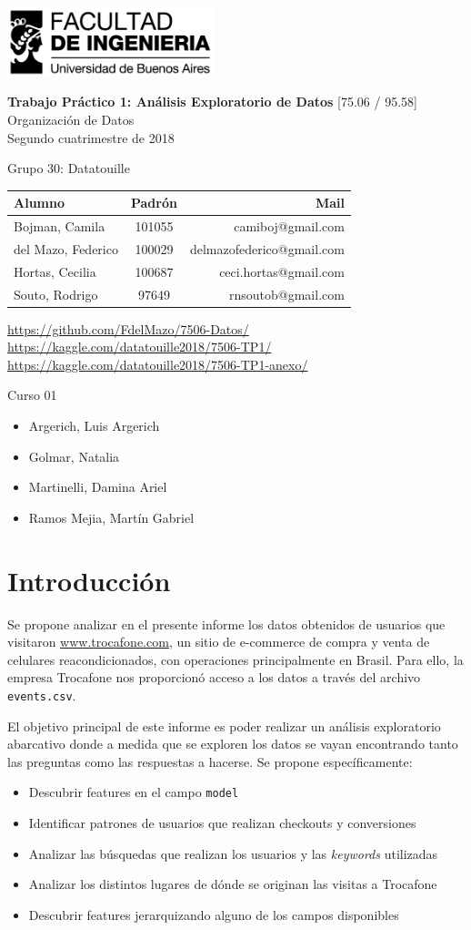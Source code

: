 \documentclass[a4paper]{article}
\makeatletter
\newcommand{\materia}{[75.06 / 95.58] Organización de Datos}
\newcommand{\trabajo}{Trabajo Práctico 1: Análisis Exploratorio de Datos}
\newcommand{\cuatrimestre}{Segundo cuatrimestre de 2018}
\newcommand{\grupo}{Grupo 30: Datatouille}
\newcommand{\repo}{https://github.com/FdelMazo/7506-Datos/}
\newcommand{\kernel}{https://kaggle.com/datatouille2018/7506-TP1/}
\newcommand{\kernanexo}{https://kaggle.com/datatouille2018/7506-TP1-anexo/}
\newcommand{\alumnos}{
    Bojman, Camila & 101055 &  camiboj@gmail.com\\
    del Mazo, Federico & 100029 & delmazofederico@gmail.com\\
    Hortas, Cecilia & 100687 & ceci.hortas@gmail.com\\
    Souto, Rodrigo & 97649 & rnsoutob@gmail.com\\
}
\newcommand{\curso}{Curso 01}
\newcommand{\docentes}{
    \item Argerich, Luis Argerich
    \item Golmar, Natalia
    \item Martinelli, Damina Ariel
    \item Ramos Mejia, Martín Gabriel
}
\makeatother
\begin{document}

\begin{titlepage}
	\hfill\includegraphics[width=6cm]{fiuba.jpg}
    \begin{center}
    \vfill
    \Huge \textbf{\trabajo}
    \vskip2cm
    \Large \materia\\
    \cuatrimestre
    \vfill
    \begin{flushleft} 
    \grupo
    \end{flushleft}
    \begin{tabular}{|l|c|r|}
	\hline
	Alumno & Padrón & Mail\\
	\hline \hline
    \alumnos
	\hline
	\end{tabular}
    \begin{flushleft} 
    \large{\url{\repo}} \\
    \large{\url{\kernel}} \\
	\large{\url{\kernanexo}}
    \end{flushleft}
    \vskip1cm
    \end{center}
    \curso
    \begin{itemize}
        \docentes
    \end{itemize}
\end{titlepage}
\tableofcontents
\newpage
{}
\setcounter{page}{1}

\section{Introducción}

Se propone analizar en el presente informe los datos obtenidos de usuarios que visitaron \url{www.trocafone.com}, un sitio de e-commerce de compra y venta de celulares reacondicionados, con operaciones principalmente en Brasil. Para ello, la empresa Trocafone nos proporcionó acceso a los datos a través del archivo \texttt{events.csv}. 

El objetivo principal de este informe es poder realizar un análisis exploratorio abarcativo donde a medida que se exploren los datos se vayan encontrando tanto las preguntas como las respuestas a hacerse. Se propone específicamente:
 
 \begin{itemize}
	 \item Descubrir features en el campo \texttt{model}
	 \item Identificar patrones de usuarios que realizan checkouts y conversiones
	 \item Analizar las búsquedas que realizan los usuarios y las \textit{keywords} utilizadas
	 \item Analizar los distintos lugares de dónde se originan las visitas a Trocafone
	 \item Descubrir features jerarquizando alguno de los campos disponibles
\end{itemize}
\end{document}
